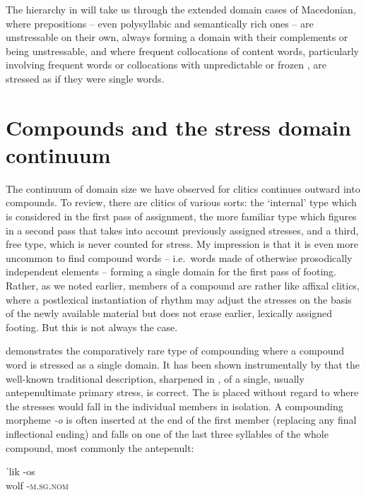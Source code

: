 \documentclass[output=paper,
modfonts
]{LSP/langsci}
\begin{document}
\begin{exe}
The hierarchy in  will take us through the extended domain cases of Macedonian, where prepositions -- even polysyllabic and semantically rich ones -- are unstressable on their own, always forming a  domain with their complements or being unstressable, and where frequent collocations of content words, particularly involving frequent words or collocations with unpredictable or frozen , are stressed as if they were single words. 

\section[Compounds and the stress domain continuum]{Compounds and the stress domain continuum}\label{sec:kaisse:3}

The continuum of domain size we have observed for clitics continues outward into compounds. To review, there are clitics of various sorts: the ‘internal’ type which is considered in the first pass of  assignment, the more familiar type which figures in a second pass that takes into account previously assigned stresses, and a third, free type, which is never counted for stress. My impression is that it is even more uncommon to find compound words -- i.e.\ words made of otherwise prosodically independent elements -- forming a single domain for the first pass of footing. Rather, as we noted earlier, members of a compound are rather like affixal clitics, where a postlexical instantiation of rhythm may adjust the stresses on the basis of the newly available material but does not erase earlier, lexically assigned footing. But this is not always the case.

 demonstrates the comparatively rare type of compounding where a compound word is stressed as a single domain. It has been shown instrumentally by \citet{athanasopoulou2014} that the well-known traditional description, sharpened in \citet{ralli2013}, of a single, usually antepenultimate primary stress, is correct. The  is placed without regard to where the stresses would fall in the individual members in isolation. A compounding morpheme \textit{{}-o} is often inserted at the end of the first member (replacing any final inflectional ending) and  falls on one of the last three syllables of the whole compound, most commonly the antepenult:

\ea \label{ex:kaisse:16}  \citep{athanasopoulou2014,ralli2013}
	\ea \label{ex:kaisse:16a} \gll ˈlik \squish-os \\
 	wolf \squish-\textsc{m.sg.nom}\\
	

\end{exe}
\end{document}
